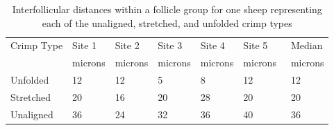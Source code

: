 %

\begin{table}[htp]
\centering
\caption{Interfollicular distances within a follicle group for one sheep representing each of the unaligned, stretched, and unfolded crimp types}
\label{tab:ifdist}
\vspace{0.1in}
\begin{tabular}{|p{0.7in}|p{0.4in}|p{0.4in}|p{0.4in}|p{0.4in}|p{0.4in}||p{0.4in}|} \hline
     Crimp Type & Site 1 & Site 2 & Site 3 & Site 4 & Site 5 & Median\\ 
   & microns  & microns & microns & microns  & microns\ & microns\\ \hline
 Unfolded & 12 & 12 & 5 & 8  & 12 & 12 \\
 Stretched & 20 & 16 & 20 & 28 & 20 & 20 \\
 Unaligned & 36 & 24 & 32 & 36 & 40 & 36 \\ \hline
\end{tabular}
\end{table}

%
